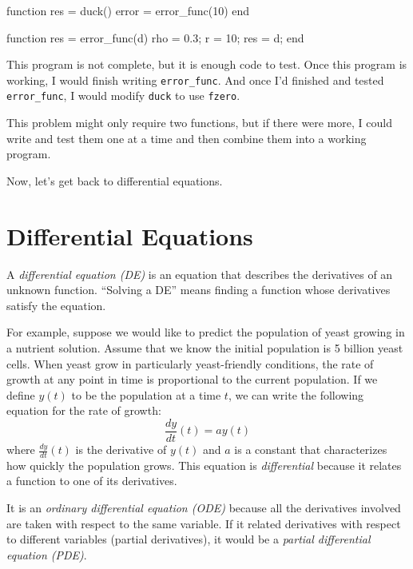 \begin{code}
function res = duck()
    error = error_func(10)
end

function res = error_func(d)
    rho = 0.3;      %
    r = 10;         %
    res = d;
end
\end{code}

This program is not complete, but it is enough code to test.
Once this program is working, I would finish writing \lstinline{error_func}.
And once I'd finished and tested \lstinline{error_func}, I would modify
\lstinline{duck} to use \lstinline{fzero}.

This problem might only require two functions, but if there
were more, I could write and test them one at a time and then
combine them into a working program.

Now, let's get back to differential equations.


\section{Differential Equations}
\label{diffeq}

A \emph{differential equation (DE)} is an equation that describes the
derivatives of an unknown function.  ``Solving a DE'' means finding a
function whose derivatives satisfy the equation.


For example, suppose we would like to predict the population of yeast growing in a nutrient solution.  Assume that we know the initial population is 5 billion yeast cells.
When yeast grow in particularly yeast-friendly
conditions, the rate of growth at any point in time is proportional to the current population.  If we define $y(t)$ to be the population at a time $t$, we can write the following equation for the rate of growth:
%
\begin{equation*}
\frac{dy}{dt}(t) = a y(t)
\end{equation*}
%
where $\frac{dy}{dt}(t)$ is the derivative of $y(t)$ and
$a$ is a constant that characterizes how quickly the population
grows.
This equation is \emph{differential} because it relates a function to one of its derivatives.


It is an \emph{ordinary differential equation (ODE)} because all the
derivatives involved are taken with respect to the
same variable.
If it related derivatives with respect to
different variables (partial derivatives), it would be a \emph{partial
differential equation (PDE)}.

